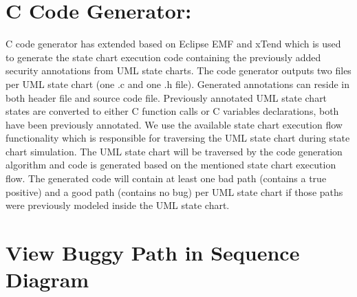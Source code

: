 \section{C Code Generator:}
C code generator has extended based on Eclipse EMF and xTend which is used to generate the state chart execution code containing the previously added security annotations from UML state charts. The code generator outputs two files per UML state chart (one .c and one
.h file). Generated annotations can reside in both header file
and source code file. Previously annotated UML state chart
states are converted to either C function calls or C variables
declarations, both have been previously annotated. We use
the available state chart execution flow functionality which is
responsible for traversing the UML state chart during state
chart simulation. The UML state chart will be traversed by the code generation algorithm and code is generated based on
the mentioned state chart execution flow. The generated code
will contain at least one bad path (contains a true positive) and
a good path (contains no bug) per UML state chart if those
paths were previously modeled inside the UML state chart.

\section{View Buggy Path in Sequence Diagram}